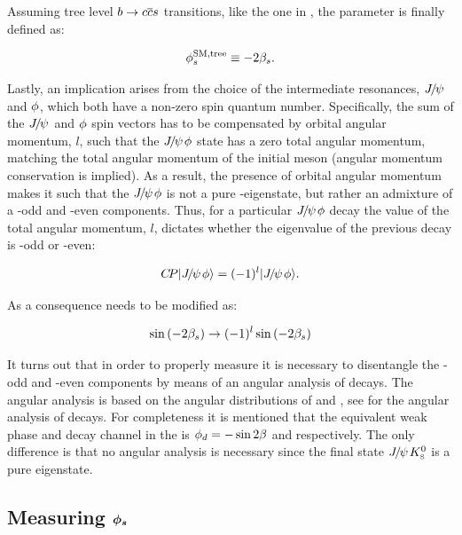 \noindent Assuming tree level $b \rightarrow c\overline {c}s$ transitions, like the one in ,
the parameter \phis is finally defined as:

\begin{equation}
  \centering
  \phiS{SM,tree}\equiv-2\betas.
 \label{phis_def}
\end{equation}

\noindent Lastly, an implication arises from the choice of the intermediate resonances, ${J\mskip -3mu/\mskip -2mu\psi\mskip 2mu}$ and $\phi$,
which both have a non-zero spin quantum number. Specifically, the sum of the ${J\mskip -3mu/\mskip -2mu\psi\mskip 2mu}$ and $\phi$ spin vectors
has to be compensated by orbital angular momentum, $l$, such that the ${J\mskip -3mu/\mskip -2mu\psi\mskip 2mu}\phi$ state has a zero total
angular momentum, matching the total angular momentum of the initial \Bs meson (angular momentum conservation is implied).
As a result, the presence of orbital angular momentum makes it such that the ${J\mskip -3mu/\mskip -2mu\psi\mskip 2mu}\phi$ is not a pure \CP-eigenstate,
but rather an admixture of a \CP-odd and \CP-even components. Thus, for a particular ${J\mskip -3mu/\mskip -2mu\psi\mskip 2mu}\phi$ decay the value of
the total angular momentum, $l$, dictates whether the \CP eigenvalue of the previous decay is \CP-odd or \CP-even:

\begin{equation}
  \centering
  \CP\ket{\jpsi\Pphi} = (-1)^l\ket{\jpsi\Pphi}.
 \label{cp_eigenstates}
\end{equation}

\noindent As a consequence  needs to be modified as:

\begin{equation}
  \centering
  \sin \parenthesis{-2\betas} \to (-1)^l \sin \parenthesis{-2\betas}
 \label{phis_def}
\end{equation}

It turns out that in order to properly measure \phis it is necessary to disentangle the \CP-odd and \CP-even
components by means of an angular analysis of \BsJpsiPhi decays. The angular analysis is based on the
angular distributions of \phiKK and \Jpsimumu, see  for the angular analysis
of \BsJpsiKst decays. For completeness it is mentioned that the equivalent weak phase and decay channel in
the \BdBdbarSyst is $\phi_{d} = -\sin 2\beta$ and \BdJpsiKS respectively. The only difference is that no
angular analysis is necessary since the final state ${J\mskip -3mu/\mskip -2mu\psi\mskip 2mu}K^0_{\rm\scriptscriptstyle S}$ is a pure \CP eigenstate.

\subsection{Measuring $\boldsymbol{\phi_{s}}$}
\label{measuring_phis}

